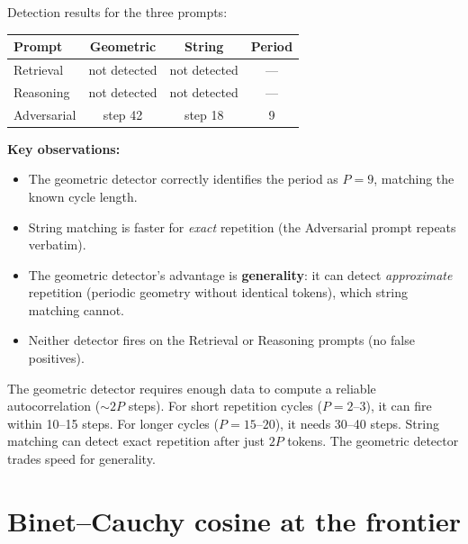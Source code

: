 \documentclass[11pt, twoside, openright]{memoir}
\numberwithin{equation}{chapter}
\begin{document}
\begin{finding}
Detection results for the three prompts:

\medskip
\begin{center}
\renewcommand{\arraystretch}{1.3}\small
\begin{tabular}{@{}l c c c@{}}
\toprule
\textbf{Prompt} & \textbf{Geometric} & \textbf{String} &
  \textbf{Period} \\
\midrule
Retrieval & not detected & not detected & --- \\
Reasoning & not detected & not detected & --- \\
Adversarial & step 42 & step 18 & 9 \\
\bottomrule
\end{tabular}
\end{center}

\medskip
\textbf{Key observations:}

\begin{itemize}[nosep]
\item The geometric detector correctly identifies the period as
  $P = 9$, matching the known cycle length.
\item String matching is faster for \emph{exact} repetition (the
  Adversarial prompt repeats verbatim).
\item The geometric detector's advantage is
  \textbf{generality}: it can detect \emph{approximate} repetition
  (periodic geometry without identical tokens), which string
  matching cannot.
\item Neither detector fires on the Retrieval or Reasoning prompts
  (no false positives).
\end{itemize}
\end{finding}

\begin{pitfall}
The geometric detector requires enough data to compute a reliable
autocorrelation ($\sim\!2P$ steps).  For short repetition cycles
($P = 2\text{--}3$), it can fire within 10--15 steps.  For longer
cycles ($P = 15\text{--}20$), it needs 30--40 steps.
String matching can detect exact repetition after just $2P$ tokens.
The geometric detector trades speed for generality.
\end{pitfall}


\section{Binet--Cauchy cosine at the frontier}
\label{sec:pred-bccos}
\end{document}
